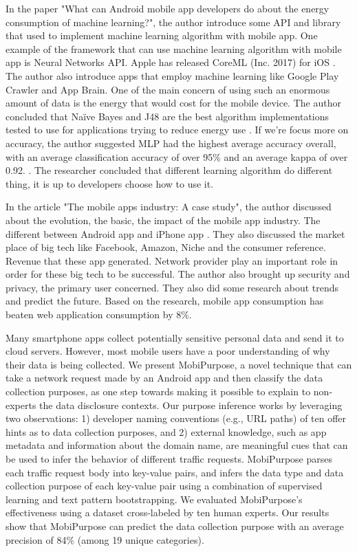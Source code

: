 \documentclass{article}
\begin{document}
\medskip

In the paper "What can Android mobile app developers do about the energy consumption of machine learning?", the author introduce some API and library that used to implement machine learning algorithm with mobile app. One example of the framework that can use machine learning algorithm with mobile app is Neural Networks API. Apple has released CoreML (Inc. 2017) for iOS \cite{mcintosh2019can}. The author also introduce apps that employ machine learning like Google Play Crawler and App Brain. One of the main concern of using such an enormous amount of data is the energy that would cost for the mobile device. The author concluded that Naïve Bayes and J48 are the best algorithm implementations tested to use for applications trying to reduce energy use \cite{mcintosh2019can}. If we're focus more on accuracy, the author suggested MLP had the highest average accuracy overall, with an average classification accuracy of over 95\% and an average kappa of over 0.92. \cite{mcintosh2019can}. The researcher concluded that different learning algorithm do different thing, it is up to developers choose how to use it.


\medskip

In the article "The mobile apps industry: A case study", the author discussed about the evolution, the basic, the impact of the mobile app industry. The different between Android app and iPhone app \cite{rakestraw2013mobile}. They also discussed the market place of big tech like Facebook, Amazon, Niche and the consumer reference. Revenue that these app generated. Network provider play an important role in order for these big tech to be successful. The author also brought up security and privacy, the primary user concerned. They also did some research about trends and predict the future. Based on the research, mobile app consumption has beaten web application consumption by 8\%. 

\medskip

Many smartphone apps collect potentially sensitive personal data and send it to cloud servers. However, most mobile users have a poor understanding of why their data is being collected. We present MobiPurpose, a novel technique that can take a network request made by an Android app and then classify the data collection purposes, as one step towards making it possible to explain to non-experts the data disclosure contexts. Our purpose inference works by leveraging two observations: 1) developer naming conventions (e.g., URL paths) of ten offer hints as to data collection purposes, and 2) external knowledge, such as app metadata and information about the domain name, are meaningful cues that can be used to infer the behavior of different traffic requests. MobiPurpose parses each traffic request body into key-value pairs, and infers the data type and data collection purpose of each key-value pair using a combination of supervised learning and text pattern bootstrapping. We evaluated MobiPurpose's effectiveness using a dataset cross-labeled by ten human experts. Our results show that MobiPurpose can predict the data collection purpose with an average precision of 84\% (among 19 unique categories).\cite{jin2018they}
\end{document}
